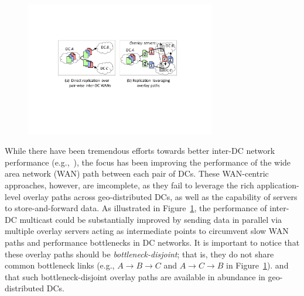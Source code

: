 \begin{figure}[t!]
\includegraphics[width=83mm]{images/intro-example-3.pdf}
\vspace{-0.4cm}
\label{fig:intro}
\vspace{-0.4cm}
\end{figure}

While there have been tremendous efforts towards better inter-DC
network performance (e.g.,~\cite{savage1999Theend,jain2013b4,
kumar2015bwe,hong2013achieving,zhang2015guarantee}), the focus has
been improving the performance of the wide area network (WAN) path
between each pair of DCs. These WAN-centric approaches, however, are
imcomplete, as they fail to leverage the rich application-level
overlay paths across geo-distributed DCs, as well as the capability
of servers to store-and-forward data.
As illustrated in Figure~\ref{fig:intro}, the performance of inter-DC
multicast could be substantially improved by sending data in parallel
via multiple overlay servers acting as intermediate points to
circumvent slow WAN paths and performance bottlenecks in DC networks.
It is important to notice that these overlay paths should be {\em
bottleneck-disjoint}; that is, they do not share common bottleneck
links (e.g., $A$$\rightarrow$$B$$\rightarrow$$C$ and
$A$$\rightarrow$$C$$\rightarrow$$B$ in Figure~\ref{fig:intro}).
and that such bottleneck-disjoint overlay paths are available in
abundance in geo-distributed DCs.




